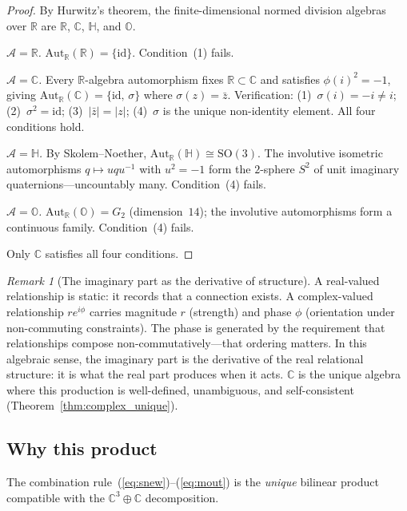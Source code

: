\documentclass[11pt,a4paper]{article}
\theoremstyle{definition}
\theoremstyle{remark}
\newtheorem{remark}[theorem]{Remark}
\newcommand{\C}{\mathbb{C}}
\newcommand{\R}{\mathbb{R}}
\begin{document}
\begin{proof}
By Hurwitz's theorem, the finite-dimensional normed division algebras over $\R$ are $\R$, $\C$, $\mathbb{H}$, and $\mathbb{O}$.

\emph{$\mathcal{A}=\R$.} $\mathrm{Aut}_\R(\R)=\{\mathrm{id}\}$. Condition~(1) fails.

\emph{$\mathcal{A}=\C$.} Every $\R$-algebra automorphism fixes $\R\subset\C$ and satisfies $\phi(i)^2=-1$, giving $\mathrm{Aut}_\R(\C)=\{\mathrm{id},\,\sigma\}$ where $\sigma(z)=\bar{z}$. Verification: (1)~$\sigma(i)=-i\neq i$; (2)~$\sigma^2=\mathrm{id}$; (3)~$|\bar{z}|=|z|$; (4)~$\sigma$ is the unique non-identity element. All four conditions hold.

\emph{$\mathcal{A}=\mathbb{H}$.} By Skolem--Noether, $\mathrm{Aut}_\R(\mathbb{H})\cong\mathrm{SO}(3)$. The involutive isometric automorphisms $q\mapsto uqu^{-1}$ with $u^2=-1$ form the $2$-sphere $S^2$ of unit imaginary quaternions---uncountably many. Condition~(4) fails.

\emph{$\mathcal{A}=\mathbb{O}$.} $\mathrm{Aut}_\R(\mathbb{O})=G_2$ (dimension~$14$); the involutive automorphisms form a continuous family. Condition~(4) fails.

Only $\C$ satisfies all four conditions.
\end{proof}

\begin{remark}[The imaginary part as the derivative of structure]\label{rem:derivative}
A real-valued relationship is static: it records that a connection exists. A complex-valued relationship $re^{i\phi}$ carries magnitude $r$ (strength) and phase $\phi$ (orientation under non-commuting constraints). The phase is generated by the requirement that relationships compose non-commutatively---that ordering matters. In this algebraic sense, the imaginary part is the derivative of the real relational structure: it is what the real part produces when it acts. $\C$ is the unique algebra where this production is well-defined, unambiguous, and self-consistent (Theorem~\ref{thm:complex_unique}).
\end{remark}

\subsection{Why this product}\label{sec:product_unique}

The combination rule~(\ref{eq:snew})--(\ref{eq:mout}) is the \emph{unique} bilinear product compatible with the $\C^3\oplus\C$ decomposition.
\end{document}
